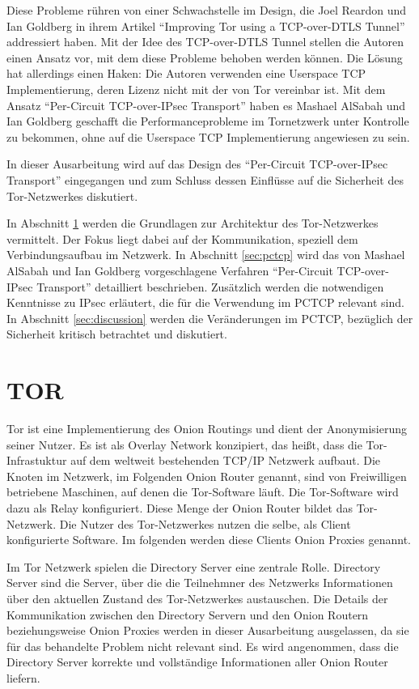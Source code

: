 \documentclass[fleqn,envcountsame,runningheads,10pt,a4paper]{llncs}
\begin{document}
Diese Probleme rühren von einer Schwachstelle im Design, die Joel Reardon und 
Ian Goldberg in ihrem Artikel ``Improving Tor using a TCP-over-DTLS 
Tunnel'' addressiert haben. Mit der Idee des TCP-over-DTLS Tunnel stellen die 
Autoren einen Ansatz vor, mit dem diese Probleme behoben werden können. Die 
Lösung hat allerdings einen Haken: Die Autoren verwenden eine Userspace TCP 
Implementierung, deren Lizenz nicht mit der von Tor vereinbar ist. Mit 
dem Ansatz ``Per-Circuit TCP-over-IPsec Transport'' haben es Mashael AlSabah und 
Ian Goldberg geschafft die Performanceprobleme im Tornetzwerk unter Kontrolle zu 
bekommen, ohne auf die Userspace TCP Implementierung angewiesen zu sein.

In dieser Ausarbeitung wird auf das Design des ``Per-Circuit TCP-over-IPsec 
Transport'' eingegangen und zum Schluss dessen Einflüsse auf die Sicherheit des 
Tor-Netzwerkes diskutiert.

In Abschnitt \ref{sec:tor} werden die Grundlagen zur Architektur des 
Tor-Netzwerkes vermittelt. Der Fokus liegt dabei auf der Kommunikation, 
speziell dem Verbindungsaufbau im Netzwerk. In Abschnitt \ref{sec:pctcp} wird 
das von Mashael AlSabah und Ian Goldberg vorgeschlagene Verfahren ``Per-Circuit 
TCP-over-IPsec Transport'' detailliert beschrieben. Zusätzlich werden die 
notwendigen Kenntnisse zu IPsec erläutert, die für die Verwendung im PCTCP 
relevant sind. In Abschnitt \ref{sec:discussion} werden die Veränderungen im 
PCTCP, bezüglich der Sicherheit kritisch betrachtet und diskutiert.

\newpage
\section{TOR}
\label{sec:tor}

Tor ist eine Implementierung des Onion Routings und dient der 
Anonymisierung seiner Nutzer. Es ist als Overlay Network konzipiert, das heißt, 
dass die Tor-Infrastuktur auf dem weltweit bestehenden TCP/IP Netzwerk 
aufbaut. Die Knoten im Netzwerk, im Folgenden Onion Router genannt, sind von 
Freiwilligen betriebene Maschinen, auf denen die Tor-Software läuft. 
Die Tor-Software wird dazu als Relay konfiguriert. Diese Menge der 
Onion Router bildet das Tor-Netzwerk. Die Nutzer des 
Tor-Netzwerkes nutzen die selbe, als Client konfigurierte Software. Im 
folgenden werden diese Clients Onion Proxies genannt.

Im Tor Netzwerk spielen die Directory Server eine zentrale Rolle. Directory 
Server sind die Server, über die die Teilnehmner des Netzwerks Informationen 
über den aktuellen Zustand des Tor-Netzwerkes austauschen. Die Details 
der Kommunikation zwischen den Directory Servern und den Onion Routern 
beziehungsweise Onion Proxies werden in dieser Ausarbeitung ausgelassen, da sie 
für das behandelte Problem nicht relevant sind. Es wird angenommen, dass die 
Directory Server korrekte und vollständige Informationen aller Onion Router 
liefern.
\end{document}
